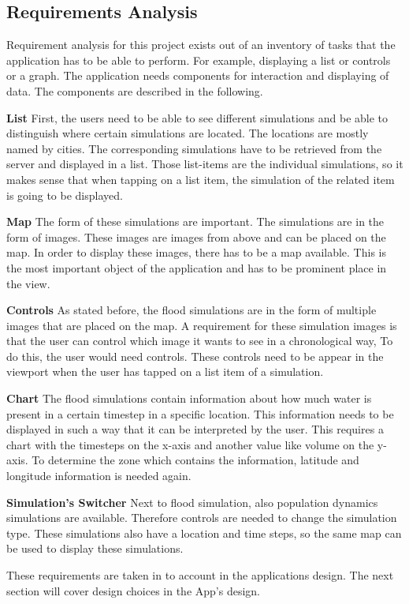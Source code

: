 \subsection{Requirements Analysis}
\label{sec:requirements}
Requirement analysis for this project exists out of an inventory of tasks that the application has to be able to perform. For example, displaying a list or controls or a graph. The application needs components for interaction and displaying of data. The components are described in the following. 
\begin{description}
\item \textbf{List}
First, the users need to be able to see different simulations and be able to distinguish where certain simulations are located. The locations are mostly named by cities. The corresponding simulations have to be retrieved from the server and displayed in a list. Those list-items are the individual simulations, so it makes sense that when tapping on a list item, the simulation of the related item is going to be displayed. 
\item \textbf{Map}
The form of these simulations are important. The simulations are in the form of images. These images are images from above and can be placed on the map. In order to display these images, there has to be a map available. This is the most important object of the application and has to be prominent place in the view.
\item \textbf{Controls}
As stated before, the flood simulations are in the form of multiple images that are placed on the map. A requirement for these simulation images is that the user can control which image it wants to see in a chronological way, To do this, the user would need controls. These controls need to be appear in the viewport when the user has tapped on a list item of a simulation.
\item \textbf{Chart}
The flood simulations contain information about how much water is present in a certain timestep in a specific location. This information needs to be displayed in such a way that it can be interpreted by the user. This requires a chart with the timesteps on the x-axis and another value like volume on the y-axis. To determine the zone which contains the information, latitude and longitude information is needed again.
\item \textbf{Simulation's Switcher} 
Next to flood simulation, also population dynamics simulations are available. Therefore controls are needed to change the simulation type. These simulations also have a location and time steps, so the same map can be used to display these simulations.

\end{description}
These requirements are taken in to account in the applications design. The next section will cover design choices in the App's design.
